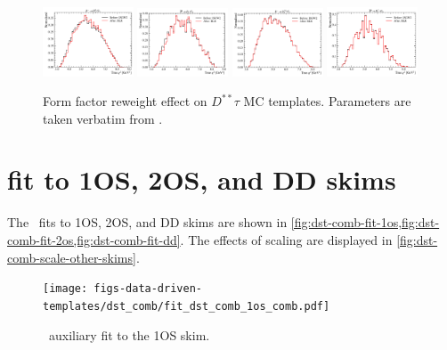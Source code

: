 \begin{figure}[ht]
    \includegraphics[width=0.24\textwidth]{
        ./figs-supplemental-plots/Dstst-form-factors/DststTau/D1stst0Tau.pdf
    }
    \includegraphics[width=0.24\textwidth]{
        ./figs-supplemental-plots/Dstst-form-factors/DststTau/D1ststTau.pdf
    }
    \includegraphics[width=0.24\textwidth]{
        ./figs-supplemental-plots/Dstst-form-factors/DststTau/D2stst0Tau.pdf
    }
    \includegraphics[width=0.24\textwidth]{
        ./figs-supplemental-plots/Dstst-form-factors/DststTau/D2ststTau.pdf
    }

    \caption{
        Form factor reweight effect on $D^{**}\tau$ MC templates.
        Parameters are taken verbatim from \cite{Bernlochner_2018}.
    }
    \label{fig:ff-rwt-raw-Dstst-sig-like}
\end{figure}


\section{\DstComb fit to 1OS, 2OS, and DD skims}
\label{appx:suppl:dst-comb}

The \DstComb\ fits to 1OS, 2OS, and DD skims are shown in
\cref{fig:dst-comb-fit-1os,fig:dst-comb-fit-2os,fig:dst-comb-fit-dd}.
The effects of scaling are displayed in
\cref{fig:dst-comb-scale-other-skims}.

\begin{figure}[htb]
    \centering
    \texttt{[image: figs-data-driven-templates/dst\_comb/fit\_dst\_comb\_1os\_comb.pdf]}
    \caption{
        \DstComb\ auxiliary fit to the 1OS skim.
    }
    \label{fig:dst-comb-fit-1os}
\end{figure}

